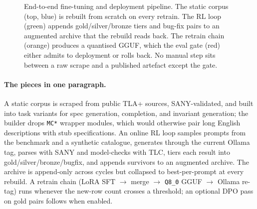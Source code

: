 \documentclass[11pt]{article}
\begin{document}
\begin{figure}[t]
\caption{End-to-end fine-tuning and deployment pipeline. The static
corpus (top, blue) is rebuilt from scratch on every retrain. The RL loop
(green) appends gold/silver/bronze tiers and bug-fix pairs to an
augmented archive that the rebuild reads back. The retrain chain
(orange) produces a quantised GGUF, which the eval gate (red) either
admits to deployment or rolls back. No manual step sits between a raw
scrape and a published artefact except the gate.}
\label{fig:pipeline}
\end{figure}

\paragraph{The pieces in one paragraph.} A static corpus is scraped from
public TLA+ sources, SANY-validated, and built into task variants for
spec generation, completion, and invariant generation; the builder drops
\texttt{MC*} wrapper modules, which would otherwise pair long English
descriptions with stub specifications. An online RL loop samples
prompts from the benchmark and a synthetic catalogue, generates through
the current Ollama tag, parses with SANY and model-checks with TLC,
tiers each result into gold/silver/bronze/bugfix, and appends survivors
to an augmented archive. The archive is append-only across cycles but
collapsed to best-per-prompt at every rebuild. A retrain chain
(LoRA SFT $\to$ merge $\to$ \texttt{Q8\_0} GGUF $\to$ Ollama re-tag)
runs whenever the new-row count crosses a threshold; an optional DPO
pass on gold pairs follows when enabled.
\end{document}
